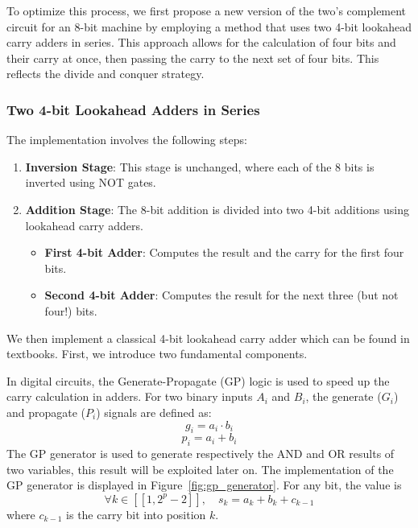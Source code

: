 \documentclass[conference]{IEEEtran}
\begin{document}
To optimize this process, we first propose a new version of the two's complement circuit for an 8-bit machine by employing a method that uses two 4-bit lookahead carry adders in series. This approach allows for the calculation of four bits and their carry at once, then passing the carry to the next set of four bits. This reflects the divide and conquer strategy.

\subsubsection{Two 4-bit Lookahead Adders in Series}\label{sec:3-A}

The implementation involves the following steps:
\begin{enumerate}
    \item \textbf{Inversion Stage}: This stage is unchanged, where each of the 8 bits is inverted using NOT gates.
    \item \textbf{Addition Stage}: The 8-bit addition is divided into two 4-bit additions using lookahead carry adders.
    \begin{itemize}
        \item \textbf{First 4-bit Adder}: Computes the result and the carry for the first four bits.
        \item \textbf{Second 4-bit Adder}: Computes the result for the next three (but not four!) bits.
    \end{itemize}
\end{enumerate}

We then implement a classical 4-bit lookahead carry adder which can be found in textbooks. First, we introduce two fundamental components.

In digital circuits, the Generate-Propagate (GP) logic is used to speed up the carry calculation in adders. For two binary inputs $A_i$ and $B_i$, the generate ($G_i$) and propagate ($P_i$) signals are defined as:
\begin{equation}
g_i = a_i \cdot b_i
\end{equation}
\begin{equation}
p_i = a_i + b_i
\end{equation}
The GP generator is used to generate respectively the AND and OR results of two variables, this result will be exploited later on.
The implementation of the GP generator is displayed in Figure~\ref{fig:gp_generator}. For any bit, the value is 
\begin{equation}
    \forall k \in [\![1, 2^p-2]\!], \quad s_k = a_k + b_k + c_{k-1}
\end{equation}
where $c_{k-1}$ is the carry bit into position $k$.
\end{document}
